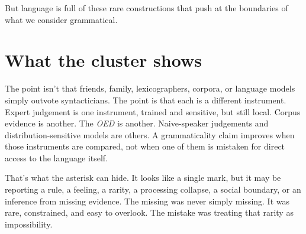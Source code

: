But language is full of these rare constructions that push at the boundaries of what we consider grammatical.

\section{What the cluster shows}

The point isn't that friends, family, lexicographers, corpora, or language models simply outvote syntacticians. The point is that each is a different instrument. Expert judgement is one instrument, trained and sensitive, but still local. Corpus evidence is another. The \textit{OED} is another. Naive-speaker judgements and distribution-sensitive models are others. A grammaticality claim improves when those instruments are compared, not when one of them is mistaken for direct access to the language itself.

That's what the asterisk can hide. It looks like a single mark, but it may be reporting a rule, a feeling, a rarity, a processing collapse, a social boundary, or an inference from missing evidence. The missing  was never simply missing. It was rare, constrained, and easy to overlook. The mistake was treating that rarity as impossibility.
